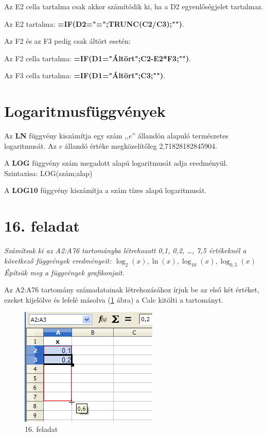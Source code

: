 Az E2 cella tartalma csak akkor számítódik ki, ha a D2
egyenlőségjelet tartalmaz.

Az E2 tartalma:
{\sffamily\bfseries{=IF(D2="=";TRUNC(C2/C3);"")}}.

Az F2 és az F3 pedig csak áltört esetén:

Az F2 cella tartalma:
{\sffamily\bfseries{=IF(D1="Áltört";C2-E2*F3;"")}}.

Az F3 cella tartalma:
{\sffamily\bfseries{=IF(D1="Áltört";C3;"")}}.


\section{Logaritmusfüggvények}

Az \textbf{LN} függvény kiszámítja egy szám
,,$e$'' állandón alapuló
természetes logaritmusát. Az $e$ állandó értéke
megközelítőleg 2,71828182845904.

\noindent A \textbf{LOG} függvény szám megadott alapú logaritmusát adja
eredményül. Szintaxisa: LOG(szám;alap)

\noindent A \textbf{LOG10} függvény kiszámítja a szám tízes alapú
logaritmusát.


\section{16. feladat}
{\itshape
Számítsuk ki az A2:A76 tartományba létrehozott 0,1, 0,2,
{\ldots}, 7,5 értékeknél a következő függvények
eredményeit:  $\log_{2}(x),\ln(x),\log_{10}(x),\log_{0,5}(x)$
Építsük meg a függvények grafikonjait.}

Az A2:A76 tartomány számadatainak létrehozásához írjuk be az
első két értéket, ezeket kijelölve és lefelé másolva
(\ref{16-feladat} ábra) a Calc kitölti a tartományt.

\begin{figure}[!h]
\begin{center}
\includegraphics[width=6.56cm]{oocalcv1-img87.png}
\caption{16. feladat}\label{16-feladat}
\end{center}
\end{figure}

